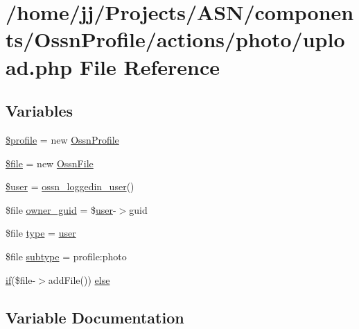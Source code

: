 \hypertarget{_ossn_profile_2actions_2photo_2upload_8php}{}\section{/home/jj/\+Projects/\+A\+S\+N/components/\+Ossn\+Profile/actions/photo/upload.php File Reference}
\label{_ossn_profile_2actions_2photo_2upload_8php}
\subsection*{Variables}
\begin{DoxyCompactItemize}
\item 
\hyperlink{_ossn_profile_2actions_2photo_2upload_8php_aada8b96bccbcf78962195b117acdc07b}{\$profile} = new \hyperlink{class_ossn_profile}{Ossn\+Profile}
\item 
\hyperlink{_ossn_profile_2actions_2photo_2upload_8php_aa1bfbd27060176201b271918dff57e8f}{\$file} = new \hyperlink{class_ossn_file}{Ossn\+File}
\item 
\hyperlink{_ossn_profile_2actions_2photo_2upload_8php_a598ca4e71b15a1313ec95f0df1027ca5}{\$user} = \hyperlink{ossn_8lib_8users_8php_aa3c8068d0e6638b414d6a2f6c62565b8}{ossn\+\_\+loggedin\+\_\+user}()
\item 
\$file \hyperlink{_ossn_profile_2actions_2photo_2upload_8php_ae1eac7270110a6c219e7f3f2006b013d}{owner\+\_\+guid} = \$\hyperlink{ossn_8config_8db_8example_8php_a802544b7ba9f79bbf24ef67773d53bed}{user}-\/$>$guid
\item 
\$file \hyperlink{_ossn_profile_2actions_2photo_2upload_8php_a527a7724584d0c97b2c0831f61045ce4}{type} = \textquotesingle{}\hyperlink{ossn_8config_8db_8example_8php_a802544b7ba9f79bbf24ef67773d53bed}{user}\textquotesingle{}
\item 
\$file \hyperlink{_ossn_profile_2actions_2photo_2upload_8php_a9a9adf8ceba16f25c922504134349f22}{subtype} = \textquotesingle{}profile\+:photo\textquotesingle{}
\item 
\hyperlink{jquery_8tokeninput_8js_ad8dd46a3cbc004569e34401e9e71771a}{if}(\$file-\/$>$add\+File()) \hyperlink{_ossn_profile_2actions_2photo_2upload_8php_a1f26f347b71818b9b83518e7c73da3a1}{else}
\end{DoxyCompactItemize}


\subsection{Variable Documentation}
